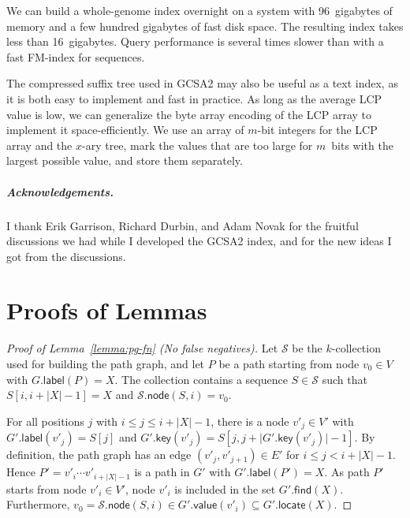 \documentclass[a4paper,UKenglish]{lipics-v2016}
\newcommand{\abs}[1]{\ensuremath{\lvert #1 \rvert}}
\newcommand{\find}{\ensuremath{\mathsf{find}}}
\newcommand{\locate}{\ensuremath{\mathsf{locate}}}
\newcommand{\glabel}{\ensuremath{\mathsf{label}}}
\newcommand{\gkey}{\ensuremath{\mathsf{key}}}
\newcommand{\gvalue}{\ensuremath{\mathsf{value}}}
\newcommand{\gnode}{\ensuremath{\mathsf{node}}}
\newcommand{\kcollection}[1]{$#1$\nobreakdash-collection}
\begin{document}
We can build a whole-genome index overnight on a system with 96~gigabytes of memory and a few hundred gigabytes of fast disk space. The resulting index takes less than 16~gigabytes. Query performance is several times slower than with a fast FM\nobreakdash-index for sequences.

The compressed suffix tree used in GCSA2 may also be useful as a text index, as it is both easy to implement and fast in practice. As long as the average LCP value is low, we can generalize the byte array encoding of the LCP array \cite{Abouelhoda2004} to implement it space-efficiently. We use an array of $m$\nobreakdash-bit integers for the LCP array and the $x$\nobreakdash-ary tree, mark the values that are too large for $m$~bits with the largest possible value, and store them separately.


\subparagraph*{Acknowledgements.}

I thank Erik Garrison, Richard Durbin, and Adam Novak for the fruitful discussions we had while I developed the GCSA2 index, and for the new ideas I got from the discussions.





\clearpage
\appendix
\section{Proofs of Lemmas}\label{appendix:proofs}

\begin{proof}[Proof of Lemma~\ref{lemma:pg-fn} (No false negatives)]
Let $\mathcal{S}$ be the \kcollection{k} used for building the path graph, and let $P$ be a path starting from node $v_{0} \in V$ with $G.\glabel(P) = X$. The collection contains a sequence $S \in \mathcal{S}$ such that $S[i, i+\abs{X}-1] = X$ and $\mathcal{S}.\gnode(S, i) = v_{0}$.

For all positions $j$ with $i \le j \le i+\abs{X}-1$, there is a node $v'_{j} \in V'$ with $G'.\glabel(v'_{j}) = S[j]$ and $G'.\gkey(v'_{j}) = S[j, j+\abs{G'.\gkey(v'_{j})}-1]$.
By definition, the path graph has an edge $(v'_{j}, v'_{j+1}) \in E'$ for $i \le j < i+\abs{X}-1$.
Hence $P' = v'_{i} \dotsm v'_{i+\abs{X}-1}$ is a path in $G'$ with $G'.\glabel(P') = X$.
As path $P'$ starts from node $v'_{i} \in V'$, node $v'_{i}$ is included in the set $G'.\find(X)$.
Furthermore, $v_{0} = \mathcal{S}.\gnode(S, i) \in G'.\gvalue(v'_{i}) \subseteq G'.\locate(X)$.
\end{proof}
\end{document}
